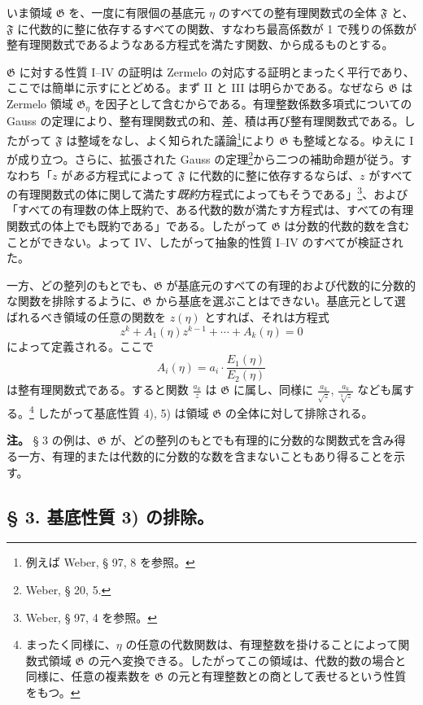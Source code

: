 いま領域 $\mathfrak G$ を、一度に有限個の基底元 $\eta$ のすべての整有理関数式の全体 $\mathfrak F$ と、$\mathfrak F$ に代数的に整に依存するすべての関数、すなわち最高係数が 1 で残りの係数が整有理関数式であるようなある方程式を満たす関数、から成るものとする。

$\mathfrak G$ に対する性質 I--IV の証明は Zermelo の対応する証明とまったく平行であり、ここでは簡単に示すにとどめる。まず II と III は明らかである。なぜなら $\mathfrak G$ は Zermelo 領域 $\mathfrak G_\eta$ を因子として含むからである。有理整数係数多項式についての Gauss の定理により、整有理関数式の和、差、積は再び整有理関数式である。したがって $\mathfrak F$ は整域をなし、よく知られた議論\footnote{例えば Weber, § 97, 8 を参照。}により $\mathfrak G$ も整域となる。ゆえに I が成り立つ。さらに、拡張された Gauss の定理\footnote{Weber, § 20, 5.}から二つの補助命題が従う。すなわち「$z$ が\emph{ある}方程式によって $\mathfrak F$ に代数的に整に依存するならば、$z$ がすべての有理関数式の体に関して満たす\emph{既約}方程式によってもそうである」\footnote{Weber, § 97, 4 を参照。}、および「すべての有理数の体上既約で、ある代数的数が満たす方程式は、すべての有理関数式の体上でも既約である」である。したがって $\mathfrak G$ は分数的代数的数を含むことができない。よって IV、したがって抽象的性質 I--IV のすべてが検証された。

一方、どの整列のもとでも、$\mathfrak G$ が基底元のすべての有理的および代数的に分数的な関数を排除するように、$\mathfrak G$ から基底を選ぶことはできない。基底元として選ばれるべき領域の任意の関数を $z(\eta)$ とすれば、それは方程式
\[
 z^k+A_1(\eta)z^{k-1}+\cdots+A_k(\eta)=0
\]
によって定義される。ここで
\[
 A_i(\eta)=a_i\cdot\frac{E_1(\eta)}{E_2(\eta)}
\]
は整有理関数式である。すると関数 $\frac{a_k}{z}$ は $\mathfrak G$ に属し、同様に $\frac{a_k}{\sqrt z}$, $\frac{a_k}{\sqrt[3]z}$ なども属する。\footnote{まったく同様に、$\eta$ の任意の代数関数は、有理整数を掛けることによって関数式領域 $\mathfrak G$ の元へ変換できる。したがってこの領域は、代数的数の場合と同様に、任意の複素数を $\mathfrak G$ の元と有理整数との商として表せるという性質をもつ。} したがって基底性質 4), 5) は領域 $\mathfrak G$ の全体に対して排除される。

\textbf{注。} § 3 の例は、$\mathfrak G$ が、どの整列のもとでも有理的に分数的な関数式を含み得る一方、有理的または代数的に分数的な数を含まないこともあり得ることを示す。

\subsection*{§ 3. 基底性質 3) の排除。}

